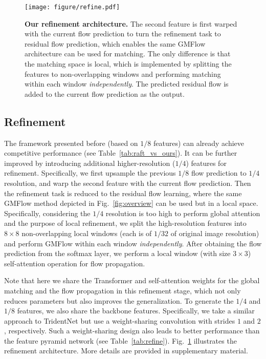 \documentclass[10pt,twocolumn,letterpaper]{article}
\begin{document}
\begin{figure}[t]
    \centering
    \texttt{[image: figure/refine.pdf]}
    \vspace{-6pt}
    \caption{\textbf{Our refinement architecture.} The second feature is first warped with the current flow prediction to turn the refinement task to residual flow prediction, which enables the same GMFlow architecture can be used for matching. The only difference is that the matching space is local, which is implemented by splitting the features to non-overlapping windows and performing matching within each window \emph{independently}. The predicted residual flow is added to the current flow prediction as the output.}
    \label{fig:refine}
    \vspace{-12pt}
\end{figure}

\subsection{Refinement}
\label{sec:refine}

The framework presented before (based on $1/8$ features) can already achieve competitive performance (see Table~\ref{tab:raft_vs_ours}). It can be further improved by introducing additional higher-resolution ($1/4$) features for refinement. Specifically, we first upsample the previous $1/8$ flow prediction to $1/4$ resolution, and warp the second feature with the current flow prediction. Then the refinement task is reduced to the residual flow learning, where the same GMFlow method depicted in Fig.~\ref{fig:overview} can be used but in a local space. Specifically, considering the $1/4$ resolution is too high to perform global attention and the purpose of local refinement, we split the high-resolution features into $8 \times 8$ non-overlapping local windows (each is of $1/32$ of original image resolution) and perform GMFlow within each window \emph{independently}. After obtaining the flow prediction from the softmax layer, we perform a local window (with size $3 \times 3$) self-attention operation for flow propagation. 

Note that here we share the Transformer and self-attention weights for the global matching and the flow propagation in this refinement stage, which not only reduces parameters but also improves the generalization. To generate the $1/4$ and $1/8$ features, we also share the backbone features. Specifically, we take a similar approach to TridentNet \cite{li2019scale} but use a weight-sharing convolution with strides $1$ and $2$, respectively. Such a weight-sharing design also leads to better performance than the feature pyramid network \cite{lin2017feature} (see Table~\ref{tab:refine}). Fig.~\ref{fig:refine} illustrates the refinement architecture. More details are provided in supplementary material. 
\end{document}
